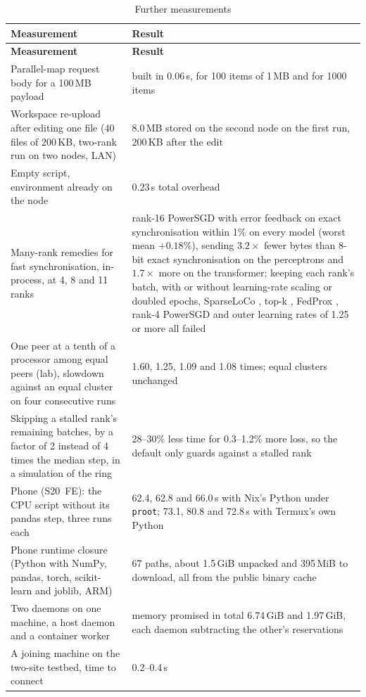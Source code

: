 {\renewcommand{\arraystretch}{1.2}
\small
\begin{longtable}{L{6.0cm} L{7.6cm}}
\caption{Further measurements}
\label{tab:later} \\
\toprule
\textbf{Measurement} & \textbf{Result} \\
\midrule
\endfirsthead
\toprule
\textbf{Measurement} & \textbf{Result} \\
\midrule
\endhead
\bottomrule
\endlastfoot
Parallel-map request body for a 100\,MB payload & built in 0.06\,s, for 100 items of 1\,MB and for 1000 items \\
Workspace re-upload after editing one file (40 files of 200\,KB, two-rank run on two nodes, LAN) & 8.0\,MB stored on the second node on the first run, 200\,KB after the edit \\
Empty script, environment already on the node & 0.23\,s total overhead \\
Many-rank remedies for fast synchronisation, in-process, at 4, 8 and 11 ranks & rank-16 PowerSGD with error feedback on exact synchronisation within 1\% on every model (worst mean $+0.18\%$), sending $3.2\times$ fewer bytes than 8-bit exact synchronisation on the perceptrons and $1.7\times$ more on the transformer; keeping each rank's batch, with or without learning-rate scaling \cite{goyal2017imagenet, hoffer2017trainlonger, johnson2020adascale} or doubled epochs, SparseLoCo \cite{sarfi2025sparseloco}, top-k \cite{aji2017sparse}, FedProx \cite{li2020fedprox}, rank-4 PowerSGD and outer learning rates of 1.25 or more all failed \\
One peer at a tenth of a processor among equal peers (lab), slowdown against an equal cluster on four consecutive runs & 1.60, 1.25, 1.09 and 1.08 times; equal clusters unchanged \\
Skipping a stalled rank's remaining batches, by a factor of 2 instead of 4 times the median step, in a simulation of the ring & 28--30\% less time for 0.3--1.2\% more loss, so the default only guards against a stalled rank \\
Phone (S20~FE): the CPU script without its pandas step, three runs each & 62.4, 62.8 and 66.0\,s with Nix's Python under \texttt{proot}; 73.1, 80.8 and 72.8\,s with Termux's own Python \\
Phone runtime closure (Python with NumPy, pandas, torch, scikit-learn and joblib, ARM) & 67 paths, about 1.5\,GiB unpacked and 395\,MiB to download, all from the public binary cache \\
Two daemons on one machine, a host daemon and a container worker & memory promised in total 6.74\,GiB and 1.97\,GiB, each daemon subtracting the other's reservations \\
A joining machine on the two-site testbed, time to connect & 0.2--0.4\,s \\
\end{longtable}}
